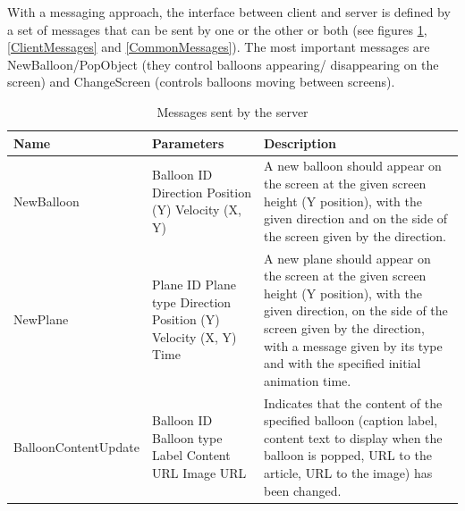With a messaging approach, the interface between client and server is defined by 
a set of messages that can be sent by one or the other or both (see figures 
\ref{ServerMessages}, \ref{ClientMessages} and \vref{CommonMessages}). The most
important messages are NewBalloon/PopObject (they control balloons appearing/
disappearing on the screen) and ChangeScreen (controls balloons moving between
screens).

\begin{table}
\begin{tabular}{|>{\raggedright}p{4.3cm}|>{\raggedright}p{2.8cm}|>{\raggedright}p{8.7cm}|}
\hline 
Name & Parameters & Description\tabularnewline
\hline 
NewBalloon
& Balloon ID 
\newline Direction
\newline Position (Y)
\newline Velocity (X, Y)
& A new balloon should appear on the screen at the given screen height (Y position),
with the given direction and on the side of the screen given by the direction.
\tabularnewline
\hline 
NewPlane
& Plane ID 
\newline Plane type
\newline Direction
\newline Position (Y)
\newline Velocity (X, Y)
\newline Time
& A new plane should appear on the screen at the given screen height (Y position),
with the given direction, on the side of the screen given by the direction, with
a message given by its type and with the specified initial animation time.
\tabularnewline
\hline 
BalloonContentUpdate
& Balloon ID 
\newline Balloon type
\newline Label
\newline Content
\newline URL
\newline Image URL
& Indicates that the content of the specified balloon (caption label, content
text to display when the balloon is popped, URL to the article, URL to the image) 
has been changed. 
\tabularnewline
\hline 
\end{tabular}

\caption{Messages sent by the server}

\label{ServerMessages}
\end{table}


